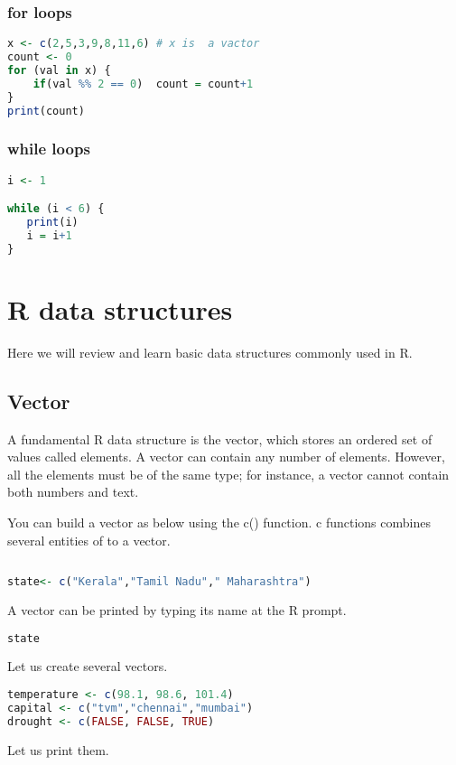 \documentclass["../Applied_probabillity _and_statistics_lab_KTU.tex"]{subfiles}
\begin{document}
 \subsubsection*{for loops}
    \begin{lstlisting}[language=R]
 x <- c(2,5,3,9,8,11,6) # x is  a vactor 
count <- 0
for (val in x) {
    if(val %% 2 == 0)  count = count+1
}
print(count)

\end{lstlisting}
 \subsubsection*{while loops}
    \begin{lstlisting}[language=R]
 i <- 1

while (i < 6) {
   print(i)
   i = i+1
}

\end{lstlisting}
 
 \section{R data structures}
 

Here we will review and learn basic data structures commonly used in R.
\subsection{Vector}


A fundamental R data structure is the vector, which stores an ordered set of values called elements. A vector can contain any number of elements. However, all the elements must be of the same type; for instance, a vector cannot contain both numbers and text.

You can build a vector as below using the c() function. c functions combines several entities of to a vector.
   
    \begin{lstlisting}[language=R]
 
state<- c("Kerala","Tamil Nadu"," Maharashtra")

\end{lstlisting}
 
 A vector can be printed by typing its name at the R prompt.
    \begin{lstlisting}[language=R]
state
\end{lstlisting}
 Let us create several vectors.

    \begin{lstlisting}[language=R]
temperature <- c(98.1, 98.6, 101.4)
capital <- c("tvm","chennai","mumbai")
drought <- c(FALSE, FALSE, TRUE)
\end{lstlisting}
 Let us print them.
\end{document}
